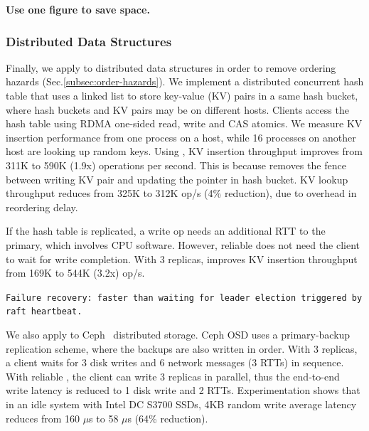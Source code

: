 \textbf{Use one figure to save space.}

\subsubsection{Distributed Data Structures}
\label{subsec:eval-transactions}

Finally, we apply \sys{} to distributed data structures in order to remove ordering hazards (Sec.\ref{subsec:order-hazards}).
We implement a distributed concurrent hash table that uses a linked list to store key-value (KV) pairs in a same hash bucket, where hash buckets and KV pairs may be on different hosts.
Clients access the hash table using RDMA one-sided read, write and CAS atomics.
We measure KV insertion performance from one process on a host, while 16 processes on another host are looking up random keys.
Using \sys{}, KV insertion throughput improves from 311K to 590K (1.9x) operations per second.
This is because \sys{} removes the fence between writing KV pair and updating the pointer in hash bucket.
KV lookup throughput reduces from 325K to 312K op/s (4\% reduction), due to overhead in reordering delay.

If the hash table is replicated, a write op needs an additional RTT to the primary, which involves CPU software. However, reliable \sys{} does not need the client to wait for write completion.
With 3 replicas, \sys{} improves KV insertion throughput from 169K to 544K (3.2x) op/s.

\texttt{Failure recovery: faster than waiting for leader election triggered by raft heartbeat.}

We also apply \sys{} to Ceph~\cite{weil2006ceph} distributed storage. Ceph OSD uses a primary-backup replication scheme, where the backups are also written in order. With 3 replicas, a client waits for 3 disk writes and 6 network messages (3 RTTs) in sequence. With reliable \sys{}, the client can write 3 replicas in parallel, thus the end-to-end write latency is reduced to 1 disk write and 2 RTTs. Experimentation shows that in an idle system with Intel DC S3700 SSDs, 4KB random write average latency reduces from 160 $\mu$s to 58 $\mu$s (64\% reduction).




